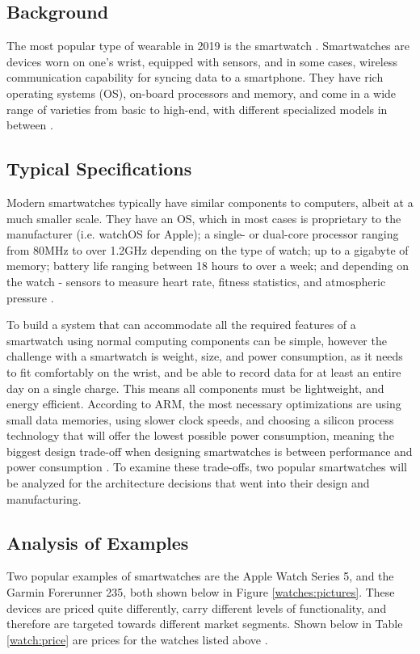 \subsection{Background}
The most popular type of wearable in 2019 is the smartwatch \cite{best_watches}. 
Smartwatches are devices worn on one's wrist, equipped with sensors, and in some 
cases, wireless communication capability for syncing data to a smartphone. They have
rich operating systems (OS), on-board processors and memory, and come in a wide range
of varieties from basic to high-end, with different specialized models in between \cite{smartwatch_arch_rit}.

\subsection{Typical Specifications}
Modern smartwatches typically have similar components to computers, albeit at a much smaller scale.
They have an OS, which in most cases is proprietary to the manufacturer (i.e. watchOS for Apple);
a single- or dual-core processor ranging from 80MHz to over 1.2GHz depending on the type of watch;
up to a gigabyte of memory; battery life ranging between 18 hours to over a week; and depending on 
the watch - sensors to measure heart rate, fitness statistics, 
and atmospheric pressure \cite{smartwatch_arch_rit}.

To build a system that can accommodate all the required features of a smartwatch
using normal computing components can be simple, however 
the challenge with a smartwatch is weight, size, and power
consumption, as it needs to fit comfortably on the wrist, and be able to record data for at least
an entire day on a single charge. This means all components must be lightweight, and energy efficient.
According to ARM, the most necessary optimizations are using small data memories, using slower clock
speeds, and choosing a silicon process technology that will offer the lowest possible power consumption,
meaning the biggest design trade-off when designing smartwatches is between performance and 
power consumption \cite{arm_wearable}. To examine these trade-offs, two popular smartwatches will be
analyzed for the architecture decisions that went into their design and manufacturing.

\subsection{Analysis of Examples}
Two popular examples of smartwatches are the Apple Watch Series 5,
and the Garmin Forerunner 235, both shown below in Figure \ref{watches:pictures}.
These devices are priced quite differently, carry different levels of functionality, and
therefore are targeted towards different market segments. Shown below in Table \ref{watch:price} are 
prices for the watches listed above \cite{apple_price} \cite{garmin_price}.

